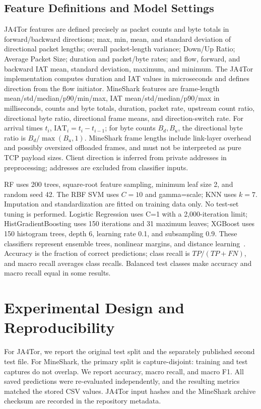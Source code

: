 \documentclass[conference]{IEEEtran}
\begin{document}
\subsection{Feature Definitions and Model Settings}
JA4Tor features are defined precisely as packet counts and byte totals in forward/backward directions; max, min, mean, and standard deviation of directional packet lengths; overall packet-length variance; Down/Up Ratio; Average Packet Size; duration and packet/byte rates; and flow, forward, and backward IAT mean, standard deviation, maximum, and minimum. The JA4Tor implementation computes duration and IAT values in microseconds and defines direction from the flow initiator. MineShark features are frame-length mean/std/median/p90/min/max, IAT mean/std/median/p90/max in milliseconds, counts and byte totals, duration, packet rate, upstream count ratio, directional byte ratio, directional frame means, and direction-switch rate. For arrival times $t_i$, $\mathrm{IAT}_i=t_i-t_{i-1}$; for byte counts $B_d,B_u$, the directional byte ratio is $B_d/\max(B_u,1)$. MineShark frame lengths include link-layer overhead and possibly oversized offloaded frames, and must not be interpreted as pure TCP payload sizes. Client direction is inferred from private addresses in preprocessing; addresses are excluded from classifier inputs.

RF uses 200 trees, square-root feature sampling, minimum leaf size 2, and random seed 42. The RBF SVM uses $C=10$ and gamma=scale; KNN uses $k=7$. Imputation and standardization are fitted on training data only. No test-set tuning is performed. Logistic Regression uses C=1 with a 2,000-iteration limit; HistGradientBoosting uses 150 iterations and 31 maximum leaves; XGBoost uses 150 histogram trees, depth 6, learning rate 0.1, and subsampling 0.9. These classifiers represent ensemble trees, nonlinear margins, and distance learning~\cite{breiman,cortes,cover,pedregosa}. Accuracy is the fraction of correct predictions; class recall is $TP/(TP+FN)$, and macro recall averages class recalls. Balanced test classes make accuracy and macro recall equal in some results.

\section{Experimental Design and Reproducibility}
For JA4Tor, we report the original test split and the separately published second test file. For MineShark, the primary split is capture-disjoint: training and test captures do not overlap. We report accuracy, macro recall, and macro F1. All saved predictions were re-evaluated independently, and the resulting metrics matched the stored CSV values. JA4Tor input hashes and the MineShark archive checksum are recorded in the repository metadata.
\end{document}
